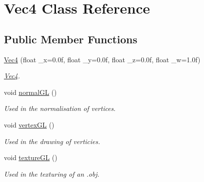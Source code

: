 \hypertarget{classVec4}{\section{Vec4 Class Reference}
\label{classVec4}
}
\subsection*{Public Member Functions}
\begin{DoxyCompactItemize}
\item 
\hyperlink{classVec4_aa433bf04a2457800e141c7df59d72763}{Vec4} (float \-\_\-x=0.\-0f, float \-\_\-y=0.\-0f, float \-\_\-z=0.\-0f, float \-\_\-w=1.\-0f)
\begin{DoxyCompactList}\small\item\em \hyperlink{classVec4}{Vec4}. \end{DoxyCompactList}\item 
\hypertarget{classVec4_acee53a901d28f815b1f7d46d8edf331c}{void \hyperlink{classVec4_acee53a901d28f815b1f7d46d8edf331c}{normal\-G\-L} ()}\label{classVec4_acee53a901d28f815b1f7d46d8edf331c}

\begin{DoxyCompactList}\small\item\em Used in the normalisation of vertices. \end{DoxyCompactList}\item 
\hypertarget{classVec4_ae480876e60e8e09b9d5d5670adfeab30}{void \hyperlink{classVec4_ae480876e60e8e09b9d5d5670adfeab30}{vertex\-G\-L} ()}\label{classVec4_ae480876e60e8e09b9d5d5670adfeab30}

\begin{DoxyCompactList}\small\item\em Used in the drawing of verticies. \end{DoxyCompactList}\item 
\hypertarget{classVec4_aacc7438ff8782f424b49819f4205d27d}{void \hyperlink{classVec4_aacc7438ff8782f424b49819f4205d27d}{texture\-G\-L} ()}\label{classVec4_aacc7438ff8782f424b49819f4205d27d}

\begin{DoxyCompactList}\small\item\em Used in the texturing of an .obj. \end{DoxyCompactList}\end{DoxyCompactItemize}
